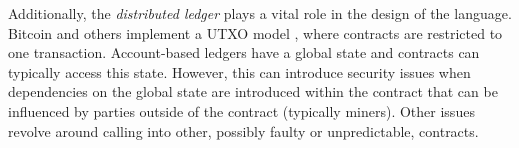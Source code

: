 Additionally, the \emph{distributed ledger} plays a vital role in the design of the language. Bitcoin and others implement a UTXO model \cite{Nakamoto2008,Covaci2018}, where contracts are restricted to one transaction. Account-based ledgers have a global state and contracts can typically access this state. 
However, this can introduce security issues when dependencies on the global state are introduced within the contract that can be influenced by parties outside of the contract (typically miners). Other issues revolve around calling into other, possibly faulty or unpredictable, contracts.


%
%
%
